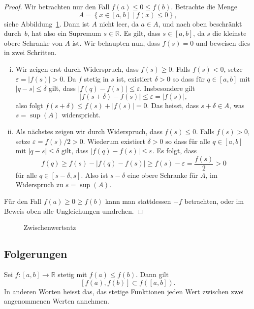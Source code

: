 \documentclass[../main.tex]{subfiles}
\begin{document}
\begin{proof}
  Wir betrachten nur den Fall $f(a) \leq 0 \leq f(b)$.
  Betrachte die Menge
  \[
    A = \left\{x \in [a, b] \mid f(x) \leq 0\right\},
  \]
  siehe Abbildung~\ref{fig:zwischen}.
  Dann ist $A$ nicht leer, da $a \in A$, und nach oben
  beschränkt durch~$b$,
  hat also ein Supremum $s \in \mathbb{R}$.
  Es gilt, dass $s \in [a,b]$, da $s$ die kleinste
  obere Schranke von $A$ ist.
  Wir behaupten nun, dass $f(s) = 0$ und beweisen
  dies in zwei Schritten.

  \begin{enumerate}[(i)]
    \item Wir zeigen erst durch Widerspruch, dass $f(s) \geq 0$.
      Falls $f(s) < 0$, setze
      $\varepsilon = |f(s)| > 0$. Da $f$ stetig in $s$ ist,
      existiert $\delta > 0$ so dass
      für $q \in [a, b]$
      mit $|q - s| \leq \delta$ gilt, dass
      $|f(q) - f(s)| \leq \varepsilon$.
      Insbesondere gilt
      \[
      |f(s + \delta) - f(s)| \leq \varepsilon = |f(s)|,
      \]
        also folgt
        $f(s + \delta) \leq f(s) + |f(s)| = 0$.
      Das heisst, dass $s + \delta \in A$, was
      $s = \sup(A)$ widerspricht.
    \item Als nächstes zeigen wir durch Widerspruch,
      dass $f(s) \leq 0$. 
      Falls $f(s) > 0$,
      setze $\varepsilon = f(s)/2 > 0$.
      Wiederum existiert $\delta > 0$ 
      so dass für alle $q \in [a, b]$ mit $|q- s| \leq \delta$ 
      gilt, dass
      $|f(q) - f(s)| \leq \varepsilon$.
      Es folgt, dass
      \[
        f(q) \geq f(s) - |f(q) - f(s)| \geq f(s) - \varepsilon = \frac{f(s)}{2}
        > 0
      \]
      für alle $q \in [s - \delta, s]$.
      Also ist $s - \delta$ eine obere Schranke für $A$,
      im Widerspruch zu $s = \sup(A)$.
  \end{enumerate}
  Für den Fall $f(a) \geq 0 \geq f(b)$ kann man
  stattdessen $-f$ betrachten,
  oder im Beweis oben alle Ungleichungen umdrehen.
\end{proof}

\begin{figure}[htb]
  \centering
  
  \caption{Zwischenwertsatz}%
  \label{fig:zwischen}
\end{figure}

\subsection*{Folgerungen}
\begin{zwischenwertsatz}
  Sei $f \colon [a, b] \to \mathbb{R} $
  stetig mit $f(a) \leq f(b)$.
  Dann gilt 
  \[[f(a), f(b)] \subset f([a, b]).\]
  In anderen Worten heisst das, das stetige
  Funktionen jeden Wert zwischen
  zwei angenommenen Werten annehmen.
\end{zwischenwertsatz}
\end{document}
